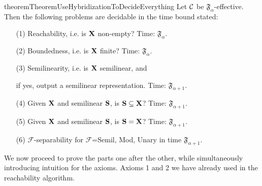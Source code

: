 \begin{restatable}{theorem}{TheoremUseHybridizationToDecideEverything} \label{TheoremUseHybridizationToDecideEverything}
Let \(\mathcal{C}\) be \(\mathfrak{F}_{\alpha}\)-effective. Then the following problems are decidable in the time bound stated:
\begin{enumerate}
\item[(1)] Reachability, i.e. is \(\mathbf{X}\) non-empty? Time: \(\mathfrak{F}_{\alpha}\).
\item[(2)] Boundedness, i.e. is \(\mathbf{X}\) finite? Time: \(\mathfrak{F}_{\alpha}\).
\item[(3)] Semilinearity, i.e. is \(\mathbf{X}\) semilinear, and 

if yes, output a semilinear representation. Time: \(\mathfrak{F}_{\alpha+1}\).

\item[(4)] Given \(\mathbf{X}\) and semilinear \(\mathbf{S}\), is \(\mathbf{S} \subseteq \mathbf{X}\)? Time: \(\mathfrak{F}_{\alpha+1}\).
\item[(5)] Given \(\mathbf{X}\) and semilinear \(\mathbf{S}\), is \(\mathbf{S} = \mathbf{X}\)? Time: \(\mathfrak{F}_{\alpha+1}\).
\item[(6)] \(\mathcal{F}\)-separability for \(\mathcal{F}\)=Semil, Mod, Unary in time \(\mathfrak{F}_{\alpha+1}\).
\end{enumerate}
\end{restatable}

We now proceed to prove the parts one after the other, while simultaneously introducing intuition for the axioms. Axioms 1 and 2 we have already used in the reachability algorithm.

%
%
%
%
%

